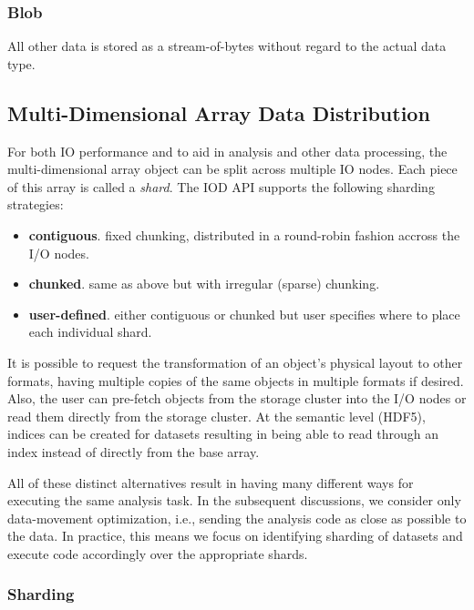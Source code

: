 \documentclass[conference]{IEEEtran}
\begin{document}
\subsubsection{Blob}
All other data is stored as a stream-of-bytes without regard to the actual
data type.

\subsection{Multi-Dimensional Array Data Distribution}

For both IO performance and to aid in analysis and other data processing, the
multi-dimensional array object can be split across multiple IO nodes. Each
piece of this array is called a {\em shard}. The IOD API supports the following
sharding strategies:

\begin{itemize}
\itemsep1pt\parskip0pt
\item
  \textbf{contiguous}. fixed chunking, distributed in a round-robin
  fashion accross the I/O nodes.
\item
  \textbf{chunked}. same as above but with irregular (sparse) chunking.
\item
  \textbf{user-defined}. either contiguous or chunked but user specifies
  where to place each individual shard.
\end{itemize}

It is possible to request the transformation of an object's physical
layout to other formats, having multiple copies of the same objects in
multiple formats if desired. Also, the user can pre-fetch objects from
the storage cluster into the I/O nodes or read them directly from the
storage cluster. At the semantic level (HDF5), indices can be created
for datasets resulting in being able to read through an index instead of
directly from the base array.

All of these distinct alternatives result in having many different ways for
executing the same analysis task.
In the subsequent discussions, we consider only
data-movement optimization, i.e., sending the analysis code as close as
possible to the data. In practice, this means we focus on identifying
sharding of datasets and execute code accordingly over the appropriate
shards.

\subsubsection{Sharding}
\label{sec:sharding}
\end{document}
